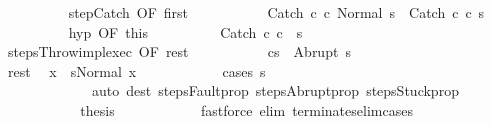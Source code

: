 \begin{isabellebody}
\ \ \ \ \ \ \ \ \isamarkupfalse%
\ step{\isachardot}Catch\ {\isacharbrackleft}OF\ first{\isacharbrackright}\isanewline
\ \ \ \ \ \ \ \ \isamarkupfalse%
\ {\isachardoublequoteopen}{\isasymGamma}{\isasymturnstile}\ {\isacharparenleft}Catch\ c\ c\ Normal\ s{\isacharparenright}\ {\isasymrightarrow}\ {\isacharparenleft}Catch\ c{\isacharprime}{\isacharprime}\ c\ s{\isacharprime}{\isacharprime}{\isacharparenright}{\isachardoublequoteclose}\isacommand{{\isachardot}}\isamarkupfalse%
\isanewline
\ \ \ \ \ \ \ \ \isamarkupfalse%
\ hyp\ {\isacharbrackleft}OF\ this{\isacharbrackright}\isanewline
\ \ \ \ \ \ \ \ \isamarkupfalse%
\ {\isachardoublequoteopen}{\isasymGamma}{\isasymturnstile}Catch\ c{\isacharprime}{\isacharprime}\ c\ {\isasymdown}\ s{\isacharprime}{\isacharprime}{\isachardoublequoteclose}\isacommand{{\isachardot}}\isamarkupfalse%
\isanewline
\ \ \ \ \ \ \ \ \isamarkupfalse%
\isanewline
\ \ \ \ \ \ \ \ \isamarkupfalse%
\ steps{\isacharunderscore}Throw{\isacharunderscore}impl{\isacharunderscore}exec\ {\isacharbrackleft}OF\ rest{\isacharbrackright}\isanewline
\ \ \ \ \ \ \ \ \isamarkupfalse%
\ {\isachardoublequoteopen}{\isasymGamma}{\isasymturnstile}\ {\isasymlangle}c{\isacharprime}{\isacharprime}{\isacharcomma}s{\isacharprime}{\isacharprime}{\isasymrangle}\ {\isasymRightarrow}\ Abrupt\ s{\isacharprime}{\isachardoublequoteclose}\isacommand{{\isachardot}}\isamarkupfalse%
\isanewline
\ \ \ \ \ \ \ \ \isamarkupfalse%
\isanewline
\ \ \ \ \ \ \ \ \isamarkupfalse%
\ rest\ \isamarkupfalse%
\ x\ \ {\isachardoublequoteopen}s{\isacharprime}{\isacharprime}{\isacharequal}Normal\ x{\isachardoublequoteclose}\isanewline
\ \ \ \ \ \ \ \ \ \ \isamarkupfalse%
\ {\isacharparenleft}cases\ s{\isacharprime}{\isacharprime}{\isacharparenright}\isanewline
\ \ \ \ \ \ \ \ \ \ \ \ \ {\isacharparenleft}auto\ dest{\isacharcolon}\ steps{\isacharunderscore}Fault{\isacharunderscore}prop\ steps{\isacharunderscore}Abrupt{\isacharunderscore}prop\ steps{\isacharunderscore}Stuck{\isacharunderscore}prop{\isacharparenright}\isanewline
\ \ \ \ \ \ \ \ \isamarkupfalse%
\ \isamarkupfalse%
\ {\isacharquery}thesis\isanewline
\ \ \ \ \ \ \ \ \ \ \isamarkupfalse%
\ {\isacharparenleft}fastforce\ elim{\isacharcolon}\ terminates{\isacharunderscore}elim{\isacharunderscore}cases{\isacharparenright}\isanewline

\end{isabellebody}

